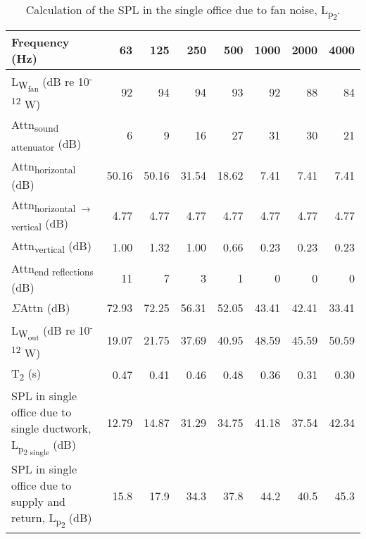 \begin{table}[htbp]
	\caption{Calculation of the SPL in the single office due to fan noise, L\textsubscript{p\textsubscript{2}}.}
	\label{tbl:BN_office}
	\centering
	\begin{tabular}{@{}lrrrrrrr@{}}
		\toprule
		Frequency (Hz) & 63 & 125 & 250 & 500 & 1000 & 2000 & 4000 \\ \midrule
		L\textsubscript{W\textsubscript{fan}} (dB re 10\textsuperscript{-12} W) & 92 & 94 & 94 & 93 & 92 & 88 & 84 \\
		Attn\textsubscript{sound attenuator} (dB) & 6 & 9 & 16 & 27 & 31 & 30 & 21 \\
		Attn\textsubscript{horizontal} (dB) & 50.16 & 50.16 & 31.54 & 18.62 & 7.41 & 7.41 & 7.41 \\
		Attn\textsubscript{horizontal $\rightarrow$ vertical} (dB) & 4.77 & 4.77 & 4.77 & 4.77 & 4.77 & 4.77 & 4.77 \\
		Attn\textsubscript{vertical} (dB) & 1.00 & 1.32 & 1.00 & 0.66 & 0.23 & 0.23 & 0.23 \\
		Attn\textsubscript{end reflections} (dB) & 11 & 7 & 3 & 1 & 0 & 0 & 0 \\
		$\Sigma$Attn (dB) & 72.93 & 72.25 & 56.31 & 52.05 & 43.41 & 42.41 & 33.41 \\
		L\textsubscript{W\textsubscript{out}} (dB re 10\textsuperscript{-12} W) & 19.07 & 21.75 & 37.69 & 40.95 & 48.59 & 45.59 & 50.59 \\
		T\textsubscript{2} (s) & 0.47 & 0.41 & 0.46 & 0.48 & 0.36 & 0.31 & 0.30 \\
		SPL in single office due to single ductwork, L\textsubscript{p\textsubscript{2 single}} (dB) & 12.79 & 14.87 & 31.29 & 34.75 & 41.18 & 37.54 & 42.34 \\
		SPL in single office due to supply and return, L\textsubscript{p\textsubscript{2}} (dB) & 15.8 & 17.9 & 34.3 & 37.8 & 44.2 & 40.5 & 45.3 \\ \bottomrule
	\end{tabular}
\end{table}
